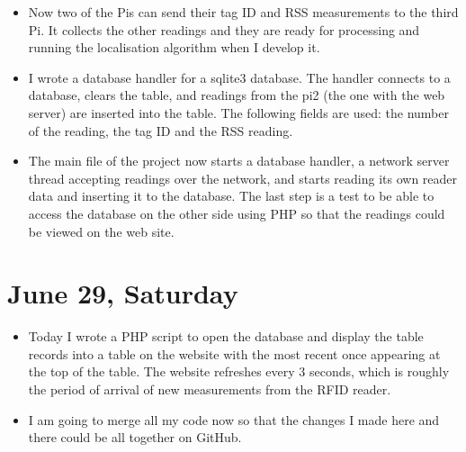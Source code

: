 \documentclass[a4paper,12pt]{article}
\begin{document}
\begin{itemize}
	\item Now two of the Pis can send their tag ID and RSS measurements to the third Pi. It collects the other readings and they are ready for processing and running the localisation algorithm when I develop it.
	\item I wrote a database handler for a sqlite3 database. The handler connects to a database, clears the table, and readings from the pi2 (the one with the web server) are inserted into the table. The following fields are used: the number of the reading, the tag ID and the RSS reading.
	\item The main file of the project now starts a database handler, a network server thread accepting readings over the network, and starts reading its own reader data and inserting it to the database. The last step is a test to be able to access the database on the other side using PHP so that the readings could be viewed on the web site.
\end{itemize}

\section{June 29, Saturday}

\begin{itemize}
	\item Today I wrote a PHP script to open the database and display the table records into a table on the website with the most recent once appearing at the top of the table. The website refreshes every 3 seconds, which is roughly the period of arrival of new measurements from the RFID reader.
	\item I am going to merge all my code now so that the changes I made here and there could be all together on GitHub.
\end{itemize}

\newpage


\end{document}
